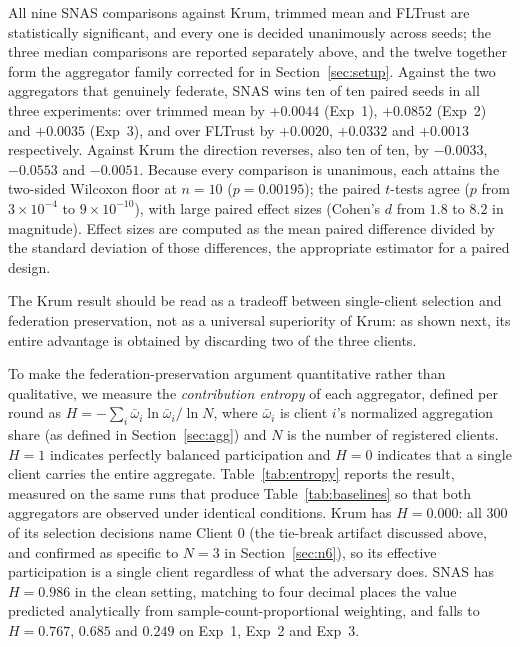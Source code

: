 \documentclass[pdflatex,sn-mathphys-num]{sn-jnl}
\begin{document}
All nine SNAS comparisons against Krum, trimmed mean and FLTrust are statistically significant, and every one is decided unanimously across seeds; the three median comparisons are reported separately above, and the twelve together form the aggregator family corrected for in Section~\ref{sec:setup}. Against the two aggregators that genuinely federate, SNAS wins ten of ten paired seeds in all three experiments: over trimmed mean by $+0.0044$ (Exp~1), $+0.0852$ (Exp~2) and $+0.0035$ (Exp~3), and over FLTrust by $+0.0020$, $+0.0332$ and $+0.0013$ respectively. Against Krum the direction reverses, also ten of ten, by $-0.0033$, $-0.0553$ and $-0.0051$. Because every comparison is unanimous, each attains the two-sided Wilcoxon floor at $n=10$ ($p=0.00195$); the paired $t$-tests agree ($p$ from $3\times10^{-4}$ to $9\times10^{-10}$), with large paired effect sizes (Cohen's $d$ from $1.8$ to $8.2$ in magnitude). Effect sizes are computed as the mean paired difference divided by the standard deviation of those differences, the appropriate estimator for a paired design.

The Krum result should be read as a tradeoff between single-client selection and federation preservation, not as a universal superiority of Krum: as shown next, its entire advantage is obtained by discarding two of the three clients.

To make the federation-preservation argument quantitative rather than qualitative, we measure the \emph{contribution entropy} of each aggregator, defined per round as $H = -\sum_{i} \bar{\omega}_i \ln \bar{\omega}_i / \ln N$, where $\bar{\omega}_i$ is client $i$'s normalized aggregation share (as defined in Section~\ref{sec:agg}) and $N$ is the number of registered clients. $H=1$ indicates perfectly balanced participation and $H=0$ indicates that a single client carries the entire aggregate. Table~\ref{tab:entropy} reports the result, measured on the same runs that produce Table~\ref{tab:baselines} so that both aggregators are observed under identical conditions. Krum has $H=0.000$: all 300 of its selection decisions name Client 0 (the tie-break artifact discussed above, and confirmed as specific to $N=3$ in Section~\ref{sec:n6}), so its effective participation is a single client regardless of what the adversary does. SNAS has $H=0.986$ in the clean setting, matching to four decimal places the value predicted analytically from sample-count-proportional weighting, and falls to $H=0.767$, $0.685$ and $0.249$ on Exp~1, Exp~2 and Exp~3.
\end{document}
